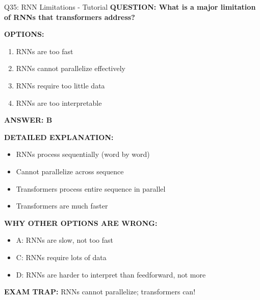 \documentclass[8pt]{beamer}
\begin{document}
	\begin{frame}{Q35: RNN Limitations - Tutorial}
		\fontsize{6.5}{7.5}\selectfont
		\textbf{QUESTION: What is a major limitation of RNNs that transformers address?}
		
		\vspace{0.1cm}
		\textbf{OPTIONS:}
		\begin{enumerate}
			\item RNNs are too fast
			\item RNNs cannot parallelize effectively
			\item RNNs require too little data
			\item RNNs are too interpretable
		\end{enumerate}
		
		\vspace{0.1cm}
		\textcolor{myblue}{\textbf{ANSWER: B}}
		
		\vspace{0.1cm}
		\textbf{DETAILED EXPLANATION:}
		\begin{itemize}
			\item RNNs process sequentially (word by word)
			\item Cannot parallelize across sequence
			\item Transformers process entire sequence in parallel
			\item Transformers are much faster
		\end{itemize}
		
		\vspace{0.1cm}
		\textcolor{myred}{\textbf{WHY OTHER OPTIONS ARE WRONG:}}
		\begin{itemize}
			\item \textcolor{myred}{A:} RNNs are slow, not too fast
			\item \textcolor{myred}{C:} RNNs require lots of data
			\item \textcolor{myred}{D:} RNNs are harder to interpret than feedforward, not more
		\end{itemize}
		
		\textcolor{myred}{\textbf{EXAM TRAP:}} RNNs cannot \textcolor{myblue}{parallelize}; transformers can!
	\end{frame}
	
	
\end{document}
